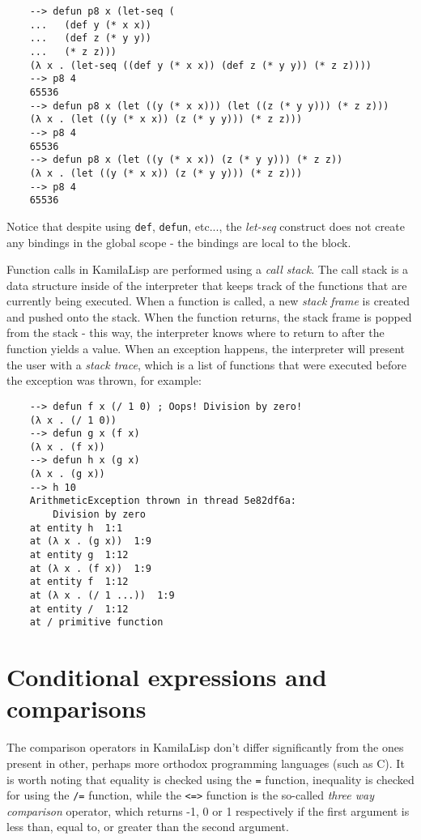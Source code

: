 \begin{Verbatim}
    --> defun p8 x (let-seq (
    ...   (def y (* x x))
    ...   (def z (* y y))
    ...   (* z z)))
    (λ x . (let-seq ((def y (* x x)) (def z (* y y)) (* z z))))
    --> p8 4
    65536
    --> defun p8 x (let ((y (* x x))) (let ((z (* y y))) (* z z)))
    (λ x . (let ((y (* x x)) (z (* y y))) (* z z)))
    --> p8 4
    65536
    --> defun p8 x (let ((y (* x x)) (z (* y y))) (* z z))
    (λ x . (let ((y (* x x)) (z (* y y))) (* z z)))
    --> p8 4
    65536
\end{Verbatim}

Notice that despite using \verb|def|, \verb|defun|, etc..., the \textit{let-seq} construct does not create any bindings in the global scope - the bindings are local to the block.

Function calls in KamilaLisp are performed using a \textit{call stack}. The call stack is a data structure inside of the interpreter that keeps track of the functions that are currently being executed. When a function is called, a new \textit{stack frame} is created and pushed onto the stack. When the function returns, the stack frame is popped from the stack - this way, the interpreter knows where to return to after the function yields a value. When an exception happens, the interpreter will present the user with a \textit{stack trace}, which is a list of functions that were executed before the exception was thrown, for example:

\begin{Verbatim}
    --> defun f x (/ 1 0) ; Oops! Division by zero!
    (λ x . (/ 1 0))
    --> defun g x (f x)
    (λ x . (f x))
    --> defun h x (g x)
    (λ x . (g x))
    --> h 10
    ArithmeticException thrown in thread 5e82df6a:
        Division by zero
    at entity h  1:1
    at (λ x . (g x))  1:9
    at entity g  1:12
    at (λ x . (f x))  1:9
    at entity f  1:12
    at (λ x . (/ 1 ...))  1:9
    at entity /  1:12
    at / primitive function
\end{Verbatim}

\section{Conditional expressions and comparisons}

The comparison operators in KamilaLisp don't differ significantly from the ones present in other, perhaps more orthodox programming languages (such as C). It is worth noting that equality is checked using the \verb|=| function, inequality is checked for using the \verb|/=| function, while the \verb|<=>| function is the so-called \textit{three way comparison} operator, which returns -1, 0 or 1 respectively if the first argument is less than, equal to, or greater than the second argument.

